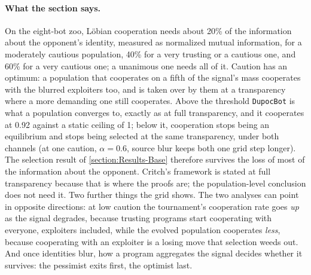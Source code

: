 \paragraph{What the section says.}
On the eight-bot zoo, Löbian cooperation needs about 20\% of the information about the opponent's identity, measured as normalized mutual information, for a moderately cautious population, 40\% for a very trusting or a cautious one, and 60\% for a very cautious one; a unanimous one needs all of it. Caution has an optimum: a population that cooperates on a fifth of the signal's mass cooperates with the blurred exploiters too, and is taken over by them at a transparency where a more demanding one still cooperates. Above the threshold \texttt{DupocBot} is what a population converges to, exactly as at full transparency, and it cooperates at 0.92 against a static ceiling of 1; below it, cooperation stops being an equilibrium and stops being selected at the same transparency, under both channels (at one caution, $\alpha = 0.6$, source blur keeps both one grid step longer). The selection result of \cref{section:Results-Base} therefore survives the loss of most of the information about the opponent. Critch's framework is stated at full transparency because that is where the proofs are; the population-level conclusion does not need it. Two further things the grid shows. The two analyses can point in opposite directions: at low caution the tournament's cooperation rate goes \emph{up} as the signal degrades, because trusting programs start cooperating with everyone, exploiters included, while the evolved population cooperates \emph{less}, because cooperating with an exploiter is a losing move that selection weeds out. And once identities blur, how a program aggregates the signal decides whether it survives: the pessimist exits first, the optimist last.
